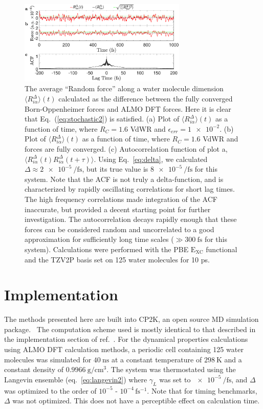 \documentclass[10pt,aps,prl,twocolumn,amsmath,amssymb,superscriptaddress,longbibliography]{revtex4-1}
\begin{document}
\begin{figure}
\includegraphics[trim={0.5cm 0.7cm 0.5cm 0cm},clip,width=8cm]{DeltaForceComparison_with_ACF.eps}
\caption{\label{fig:randomforce}The average ``Random force'' along a water molecule dimension $\langle R^{\Delta}_{i\alpha} \rangle (t)$ calculated as the difference between the fully converged Born-Oppenheimer forces and ALMO DFT forces. Here it is clear that Eq.\ (\ref{eq:stochastic2}) is satisfied. 
(a) Plot of $\langle R^{\Delta}_{i\alpha} \rangle (t)$ as a function of time, where $R_{C} = 1.6$ VdWR and $\epsilon_{err} = \num{1e-2}$.
(b) Plot of $\langle R^{\Delta}_{i\alpha} \rangle (t)$ as a function of time, where $R_{C} = 1.6$ VdWR and forces are fully converged.
(c) Autocorrelation function of plot a, $\langle R^{\Delta}_{i\alpha} (t) R^{\Delta}_{i\alpha} (t+\tau) \rangle $.
Using Eq.\ \ref{eq:delta}, we calculated $\Delta \approx \SI{2e-5}{\per\fs}$, but its true value is $\SI{8e-5}{\per\fs}$ for this system.
Note that the  ACF is not truly a delta-function, and is characterized by rapidly oscillating correlations for short lag times. 
The high frequency correlations made integration of the ACF inaccurate, but provided a decent starting point for further investigation.
The autocorrelation decays rapidly enough that these forces can be considered random and uncorrelated to a good approximation for sufficiently long time scales ($\gg\SI{300}{\fs}$ for this system). 
Calculations were performed with the PBE $\mathrm{E_{XC}}$ functional and the TZV2P basis set on 125 water molecules for 10 ps.}
\end{figure}

\section{Implementation}

The methods presented here are built into CP2K, an open source MD simulation package.~\cite{www:cp2k} 
The computation scheme used is mostly identical to that described in the implementation section of ref.\ . 
For the dynamical properties calculations using ALMO DFT calculation methods, a periodic cell containing 125 water molecules was simulated for $\SI{40}{\ns}$ at a constant temperature of $\SI{298}{\K}$ and a constant density of $\SI{0.9966}{\g\per\cm^{3}}$. 
The system was thermostated using the Langevin ensemble (eq.\ \ref{eq:langevin2}) where $\gamma_L$ was set to $\SI{e-5}{\per\fs}$, and $\Delta$ was optimized to the order of $10^{-5}$ - $10^{-4}\, \mathrm{fs^{-1}}$. 
Note that for timing benchmarks, $\Delta$ was not optimized. 
This does not have a perceptible effect on calculation time.
\end{document}
